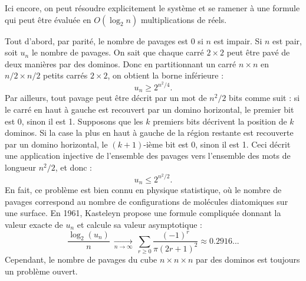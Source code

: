 

Ici encore, on peut résoudre explicitement le système et se ramener à une formule qui peut être évaluée en $O(\log_2n)$ multiplications de réels.

\Q
Tout d'abord, par parité, le nombre de pavages est 0 si $n$ est impair. Si $n$ est pair, soit $u_n$ le nombre de pavages. On sait que chaque carré $2 \times 2$ peut être pavé de deux manières par des dominos. Donc en partitionnant un carré $n \times n$ en $n/2 \times n/2$ petits carrés $2 \times 2$, on obtient la borne inférieure :
\[
    u_n \geq 2^{n^2/4}.
\]
Par ailleurs, tout pavage peut être décrit par un mot de $n^2/2$ bits comme suit : si le carré en haut à gauche est recouvert par un domino horizontal, le premier bit est 0, sinon il est 1. Supposons que les $k$ premiers bits décrivent la position de $k$ dominos. Si la case la plus en haut à gauche de la région restante est recouverte par un domino horizontal, le $(k+1)$-ième bit est 0, sinon il est 1. Ceci décrit une application injective de l'ensemble des pavages vers l'ensemble des mots de longueur $n^2/2$, et donc :
\[
    u_n \leq 2^{n^2/2}.
\]
En fait, ce problème est bien connu en physique statistique, où le nombre de pavages correspond au nombre de configurations de molécules diatomiques sur une surface. En 1961, Kasteleyn propose une formule compliquée donnant la valeur exacte de $u_n$ et calcule sa valeur asymptotique :
\[
    \frac{\log_2(u_n)}{n}\ \xrightarrow[n\to\infty]{}\ \sum_{r \geq 0}\frac{(-1)^r}{\pi(2r+1)^2} \approx 0.2916...
\]
Cependant, le nombre de pavages du cube $n \times n \times n$ par des dominos est toujours un problème ouvert.
\bigskip

\Fin
